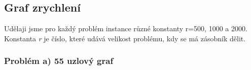 \documentclass[11pt]{article}
\begin{document}





\newpage
\subsection{Graf zrychlení}
Udělaji jsme pro každý problém instance různé konstanty r=500, 1000 a 2000. Konstanta \textit{r} je číslo, které udává velikost problému, kdy se má zásobník dělit.  

\subsubsection{Problém a) 55 uzlový graf}
\end{document}
